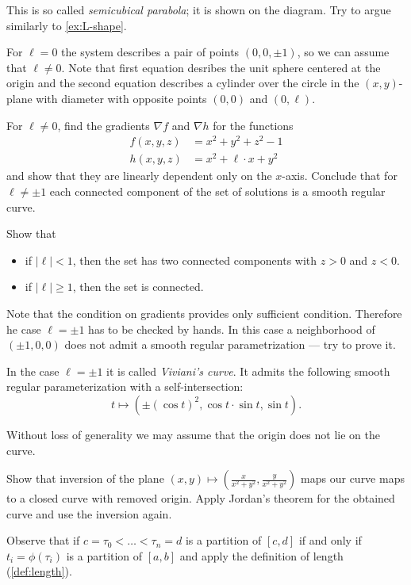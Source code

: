 This is so called \emph{semicubical parabola}; it is shown on the diagram.
Try to argue similarly to \ref{ex:L-shape}. %


For $\ell=0$ the system describes a pair of points $(0,0,\pm1)$, so we can assume that $\ell\ne 0$.
Note that first equation desribes the unit sphere centered at the origin
and the second equation describes a cylinder over the circle in the $(x,y)$-plane with diameter with opposite points $(0,0)$ and $(0,\ell)$.


For $\ell\ne 0$,
find the gradients $\nabla f$ and $\nabla h$ for the functions
\begin{align*}
 f(x,y,z)&=x^2+y^2+z^2-1
 \\
 h(x,y,z)&=x^2+\ell\cdot x+y^2
\end{align*}
and show that they are linearly dependent only on the $x$-axis.
Conclude that for $\ell\ne\pm 1$ each connected component of the set of solutions is a smooth regular curve.

Show that 
\begin{itemize}
\item if $|\ell|<1$, then the set has two connected components with $z>0$ and $z<0$.
\item if $|\ell|\ge1$, then the set is connected.
\end{itemize}

Note that the condition on gradients provides only sufficient condition.
Therefore he case $\ell=\pm1$ has to be checked by hands.
In this case a neighborhood of $(\pm1,0,0)$ does not admit a smooth regular parametrization --- try to prove it. %

In the case $\ell=\pm1$ it is called \emph{Viviani's curve}.
It admits the following smooth regular parameterization with a self-intersection:
\[t\mapsto(\pm(\cos t)^2,\cos t\cdot\sin t,\sin t).\]


Without loss of generality we may assume that the origin does not lie on the curve.

Show that inversion of the plane $(x,y)\mapsto (\tfrac{x}{x^2+y^2},\tfrac{y}{x^2+y^2})$ maps our curve maps to a closed curve with removed origin.
Apply Jordan's theorem for the obtained curve and use the inversion again.

 Observe that if $c=\tau_0<\dots<\tau_n=d$ is a partition of $[c,d]$ if and only if $t_i=\phi(\tau_i)$ is a partition of $[a,b]$ and apply the definition of length (\ref{def:length}).

